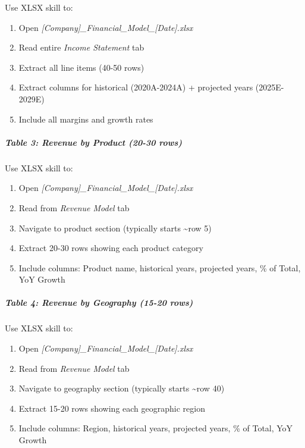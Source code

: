 \documentclass[11pt]{article}
\begin{document}
Use XLSX skill to:

\begin{enumerate}[leftmargin=*,itemsep=2pt,topsep=2pt]
\item {} Open \emph{[Company]\_\allowbreak{}Financial\_\allowbreak{}Model\_\allowbreak{}[Date].xlsx}
\item {} Read entire \emph{Income Statement} tab
\item {} Extract all line items (40-50 rows)
\item {} Extract columns for historical (2020A-2024A) + projected years (2025E-2029E)
\item {} Include all margins and growth rates
\end{enumerate}

\subparagraph{Table 3: Revenue by Product (20-30 rows)}\mbox{}\par

Use XLSX skill to:

\begin{enumerate}[leftmargin=*,itemsep=2pt,topsep=2pt]
\item {} Open \emph{[Company]\_\allowbreak{}Financial\_\allowbreak{}Model\_\allowbreak{}[Date].xlsx}
\item {} Read from \emph{Revenue Model} tab
\item {} Navigate to product section (typically starts \textasciitilde{}row 5)
\item {} Extract 20-30 rows showing each product category
\item {} Include columns: Product name, historical years, projected years, \% of Total, YoY Growth
\end{enumerate}

\subparagraph{Table 4: Revenue by Geography (15-20 rows)}\mbox{}\par

Use XLSX skill to:

\begin{enumerate}[leftmargin=*,itemsep=2pt,topsep=2pt]
\item {} Open \emph{[Company]\_\allowbreak{}Financial\_\allowbreak{}Model\_\allowbreak{}[Date].xlsx}
\item {} Read from \emph{Revenue Model} tab
\item {} Navigate to geography section (typically starts \textasciitilde{}row 40)
\item {} Extract 15-20 rows showing each geographic region
\item {} Include columns: Region, historical years, projected years, \% of Total, YoY Growth
\end{enumerate}
\end{document}
